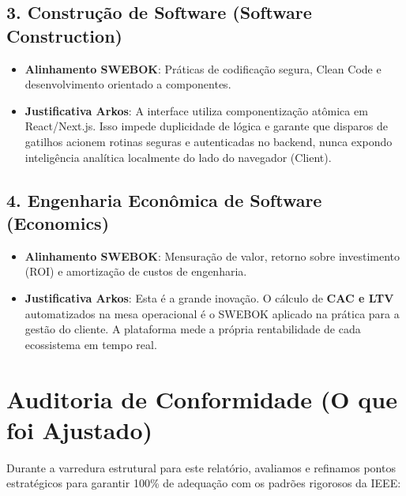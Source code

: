 \documentclass[12pt,a4paper,oneside]{report}
\begin{document}
\subsection{3. Construção de Software (Software Construction)}
\begin{itemize}
    \item \textbf{Alinhamento SWEBOK}: Práticas de codificação segura, Clean Code e desenvolvimento orientado a componentes.
    \item \textbf{Justificativa Arkos}: A interface utiliza componentização atômica em React/Next.js. Isso impede duplicidade de lógica e garante que disparos de gatilhos acionem rotinas seguras e autenticadas no backend, nunca expondo inteligência analítica localmente do lado do navegador (Client).
\end{itemize}

\subsection{4. Engenharia Econômica de Software (Economics)}
\begin{itemize}
    \item \textbf{Alinhamento SWEBOK}: Mensuração de valor, retorno sobre investimento (ROI) e amortização de custos de engenharia.
    \item \textbf{Justificativa Arkos}: Esta é a grande inovação. O cálculo de \textbf{CAC e LTV} automatizados na mesa operacional é o SWEBOK aplicado na prática para a gestão do cliente. A plataforma mede a própria rentabilidade de cada ecossistema em tempo real.
\end{itemize}

\section{Auditoria de Conformidade (O que foi Ajustado)}
Durante a varredura estrutural para este relatório, avaliamos e refinamos pontos estratégicos para garantir 100\% de adequação com os padrões rigorosos da IEEE:
\end{document}
